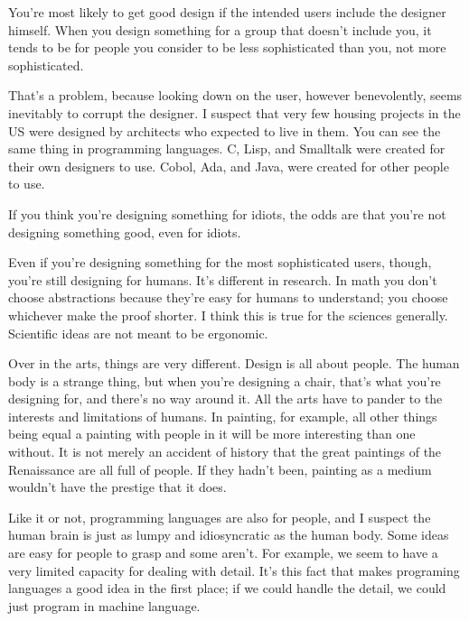 You're most
                  likely to get good design if the intended users include the
                  designer himself. When you design something for a group that
                  doesn't include you, it tends to be for people you consider to
                  be less sophisticated than you, not more sophisticated.

That's
                  a problem, because looking down on the user, however
                  benevolently, seems inevitably to corrupt the designer. I
                  suspect that very few housing projects in the US were designed
                  by architects who expected to live in them. You can see the
                  same thing in programming languages. C, Lisp, and Smalltalk
                  were created for their own designers to use. Cobol, Ada, and
                  Java, were created for other people to use.

If you
                  think you're designing something for idiots, the odds are that
                  you're not designing something good, even for idiots.




                  Even if you're designing something for the most sophisticated
                  users, though, you're still designing for humans. It's
                  different in research. In math you don't choose abstractions
                  because they're easy for humans to understand; you choose
                  whichever make the proof shorter. I think this is true for the
                  sciences generally. Scientific ideas are not meant to be
                  ergonomic.

Over in the arts, things are very
                  different. Design is all about people. The human body is a
                  strange thing, but when you're designing a chair, that's what
                  you're designing for, and there's no way around it. All the
                  arts have to pander to the interests and limitations of
                  humans. In painting, for example, all other things being equal
                  a painting with people in it will be more interesting than one
                  without. It is not merely an accident of history that the
                  great paintings of the Renaissance are all full of people. If
                  they hadn't been, painting as a medium wouldn't have the
                  prestige that it does.

Like it or not, programming
                  languages are also for people, and I suspect the human brain
                  is just as lumpy and idiosyncratic as the human body. Some
                  ideas are easy for people to grasp and some aren't. For
                  example, we seem to have a very limited capacity for dealing
                  with detail. It's this fact that makes programing languages a
                  good idea in the first place; if we could handle the detail,
                  we could just program in machine language.

